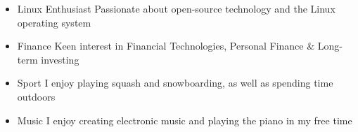 
\begin{cvopensource}


	\begin{itemize}[leftmargin=*]

		\setlength{\parskip}{0pt}

		\item\cvproject
		{Linux Enthusiast} %
		{Passionate about open-source technology and the Linux operating system} %

		\item\cvproject
		{Finance} %
		{Keen interest in Financial Technologies, Personal Finance \& Long-term investing} %

		\item\cvproject
		{Sport} %
		{I enjoy playing squash and snowboarding, as well as spending time outdoors} %

		\item\cvproject
		{Music} %
		{I enjoy creating electronic music and playing the piano in my free time} %

	\end{itemize}
\end{cvopensource}


